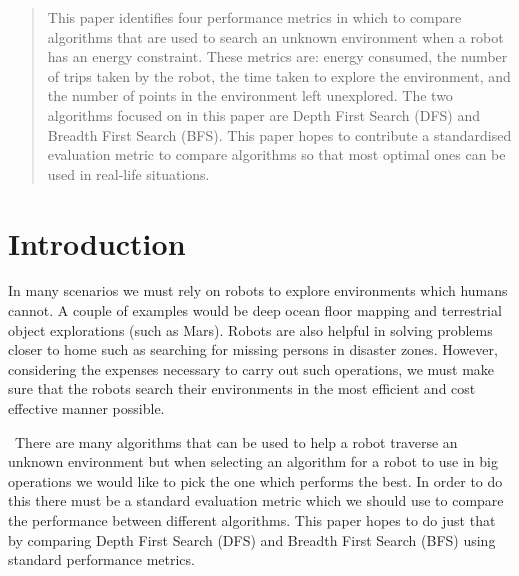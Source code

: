 \documentclass[conference]{IEEEtran}
\begin{document}
\maketitle

\begin{abstract}
This paper identifies four performance metrics in which to compare algorithms that are used to search an unknown environment when a robot has an energy constraint. These metrics are: energy consumed, the number of trips taken by the robot, the time taken to explore the environment, and the number of points in the environment left unexplored. The two algorithms focused on in this paper are Depth First Search (DFS) and Breadth First Search (BFS). This paper hopes to contribute a standardised evaluation metric to compare algorithms so that most optimal ones can be used in real-life situations.
\end{abstract}





%
\IEEEpeerreviewmaketitle



\section{Introduction}
In many scenarios we must rely on robots to explore environments which humans cannot. A couple of examples would be deep ocean floor mapping and terrestrial object explorations (such as Mars). Robots are also helpful in solving problems closer to home such as searching for missing persons in disaster zones. However, considering the expenses necessary to carry out such operations, we must make sure that the robots search their environments in the most efficient and cost effective manner possible.

\
There are many algorithms that can be used to help a robot traverse an unknown environment but when selecting an algorithm for a robot to use in big operations we would like to pick the one which performs the best. In order to do this there must be a standard evaluation metric which we should use to compare the performance between different algorithms. This paper hopes to do just that by comparing Depth First Search (DFS) and Breadth First Search (BFS) using standard performance metrics.
\end{document}
